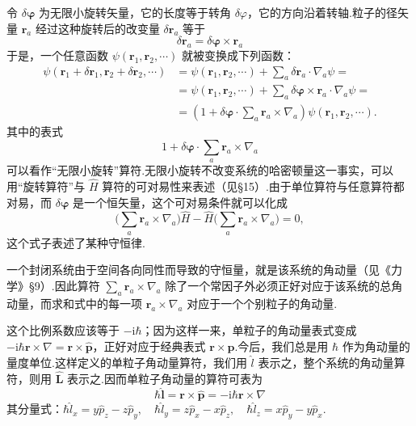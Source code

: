 令 $\delta\boldsymbol{\varphi}$ 为无限小旋转矢量，它的长度等于转角 $\delta\varphi$，它的方向沿着转轴.粒子的径矢量 $\boldsymbol{r}_a$ 经过这种旋转后的改变量 $\delta\boldsymbol{r}_a$ 等于
\begin{equation*}
  \delta\boldsymbol{r}_a=\delta\boldsymbol{\varphi}\times\boldsymbol{r}_a
\end{equation*}
于是，一个任意函数 $\psi(\boldsymbol{r}_1,\boldsymbol{r}_2,\cdots)$ 就被变换成下列函数：
\begin{equation*}
\begin{aligned}
  \psi(\boldsymbol{r}_1+\delta\boldsymbol{r}_1,\boldsymbol{r}_2+\delta\boldsymbol{r}_2,\cdots)
  &=\psi(\boldsymbol{r}_1,\boldsymbol{r}_2,\cdots)
  +\sum_a\delta\boldsymbol{r}_a\cdot\nabla_a\psi=\\
  &=\psi(\boldsymbol{r}_1,\boldsymbol{r}_2,\cdots)
  +\sum_a\delta\boldsymbol{\varphi}\times\boldsymbol{r}_a\cdot\nabla_a\psi=\\
  &=\left(1+\delta\boldsymbol{\varphi}\cdot\sum_a\boldsymbol{r}_a\times\nabla_a\right)
  \psi(\boldsymbol{r}_1,\boldsymbol{r}_2,\cdots).
\end{aligned}
\end{equation*}
其中的表式
\begin{equation*}
  1+\delta\boldsymbol{\varphi}\cdot\sum_a\boldsymbol{r}_a\times\nabla_a
\end{equation*}
可以看作“无限小旋转”算符.无限小旋转不改变系统的哈密顿量这一事实，可以用“旋转算符”与 $\hat{H}$ 算符的可对易性来表述（见§15）.由于单位算符与任意算符都对易，而 $\delta\boldsymbol{\varphi}$ 是一个恒矢量，这个可对易条件就可以化成
\begin{equation}
  \biggl(\sum_a\boldsymbol{r}_a\times\nabla_a\biggr)\hat{H}
  -\hat{H}\biggl(\sum_a\boldsymbol{r}_a\times\nabla_a\biggr)=0,
\end{equation}
这个式子表述了某种守恒律.

一个封闭系统由于空间各向同性而导致的守恒量，就是该系统的角动量（见《力学》§9）.因此算符 $\sum_a\boldsymbol{r}_a\times\nabla_a$ 除了一个常因子外必须正好对应于该系统的总角动量，而求和式中的每一项 $\boldsymbol{r}_a\times\nabla_a$ 对应于一个个别粒子的角动量.

这个比例系数应该等于 $-\mathrm{i}\hbar$；因为这样一来，单粒子的角动量表式变成 $-\mathrm{i}\hbar\boldsymbol{r}\times\nabla=\boldsymbol{r}\times\hat{\boldsymbol{p}}$，正好对应于经典表式 $\boldsymbol{r}\times\boldsymbol{p}$.今后，我们总是用 $\hbar$ 作为角动量的量度单位.这样定义的单粒子角动量算符，我们用 $\hat{l}$ 表示之，整个系统的角动量算符，则用 $\hat{\boldsymbol{L}}$ 表示之.因而单粒子角动量的算符可表为
\begin{equation}
  \hbar\hat{\boldsymbol{l}}=\boldsymbol{r}\times\hat{\boldsymbol{p}}
  =-\mathrm{i}\hbar\boldsymbol{r}\times\nabla
\end{equation}
其分量式：$\hbar\hat{l}_x=y\hat{p}_z-z\hat{p}_y,\quad
\hbar\hat{l}_y=z\hat{p}_x-x\hat{p}_z,\quad
\hbar\hat{l}_z=x\hat{p}_y-y\hat{p}_x.$

